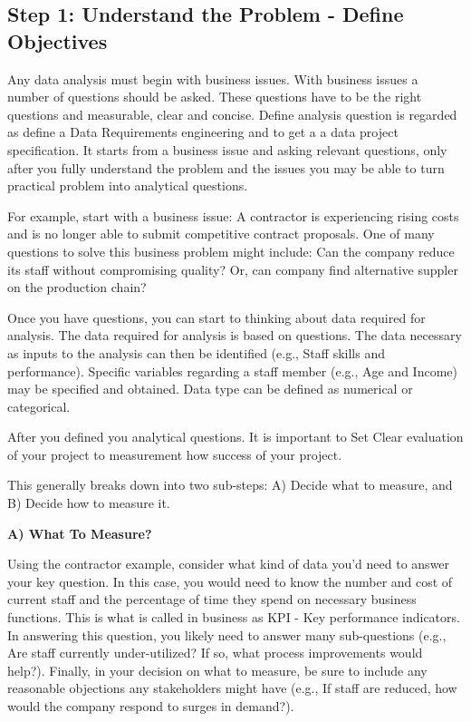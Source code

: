 \documentclass[
]{book}
\begin{document}
\hypertarget{step1}{%
\subsection*{Step 1: Understand the Problem - Define Objectives}\label{step1}}


Any data analysis must begin with business issues. With business issues a number of questions should be asked. These questions have to be the right questions and measurable, clear and concise. Define analysis question is regarded as define a Data Requirements engineering and to get a a data project specification. It starts from a business issue and asking relevant questions, only after you fully understand the problem and the issues you may be able to turn practical problem into analytical questions.

For example, start with a business issue: A contractor is experiencing rising costs and is no longer able to submit competitive contract proposals. One of many questions to solve this business problem might include: Can the company reduce its staff without compromising quality? Or, can company find alternative suppler on the production chain?

Once you have questions, you can start to thinking about data required for analysis. The data required for analysis is based on questions. The data necessary as inputs to the analysis can then be identified (e.g., Staff skills and performance). Specific variables regarding a staff member (e.g., Age and Income) may be specified and obtained. Data type can be defined as numerical or categorical.

After you defined you analytical questions. It is important to Set Clear evaluation of your project to measurement how success of your project.

This generally breaks down into two sub-steps: A) Decide what to measure, and B) Decide how to measure it.

\textbf{A) What To Measure?}

Using the contractor example, consider what kind of data you'd need to answer your key question. In this case, you would need to know the number and cost of current staff and the percentage of time they spend on necessary business functions. This is what is called in business as KPI - Key performance indicators. In answering this question, you likely need to answer many sub-questions (e.g., Are staff currently under-utilized? If so, what process improvements would help?). Finally, in your decision on what to measure, be sure to include any reasonable objections any stakeholders might have (e.g., If staff are reduced, how would the company respond to surges in demand?).
\end{document}
